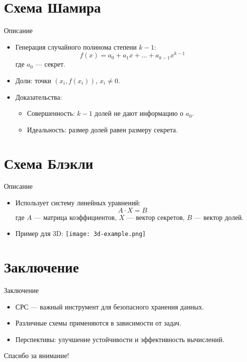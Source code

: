\documentclass{beamer}
\begin{document}
\section{Схема Шамира}
\begin{frame}{Описание}
    \begin{itemize}
        \item Генерация случайного полинома степени \( k-1 \):
        \[
        f(x) = a_0 + a_1x + \dots + a_{k-1}x^{k-1}
        \]
        где \( a_0 \) — секрет.
        \item Доли: точки \( (x_i, f(x_i)) \), \( x_i \neq 0 \).
        \item Доказательства:
        \begin{itemize}
            \item Совершенность: \( k-1 \) долей не дают информацию о \( a_0 \).
            \item Идеальность: размер долей равен размеру секрета.
        \end{itemize}
    \end{itemize}
\end{frame}

\section{Схема Блэкли}
\begin{frame}{Описание}
    \begin{itemize}
        \item Использует систему линейных уравнений:
        \[
        A \cdot X = B
        \]
        где \( A \) — матрица коэффициентов, \( X \) — вектор секретов, \( B \) — вектор долей.
        \item Пример для 3D:
        \texttt{[image: 3d-example.png]} %
    \end{itemize}
\end{frame}

\section{Заключение}
\begin{frame}{Заключение}
    \begin{itemize}
        \item СРС — важный инструмент для безопасного хранения данных.
        \item Различные схемы применяются в зависимости от задач.
        \item Перспективы: улучшение устойчивости и эффективность вычислений.
    \end{itemize}
\end{frame}

\begin{frame}
    \centering
    \Huge Спасибо за внимание!
\end{frame}
\end{document}
